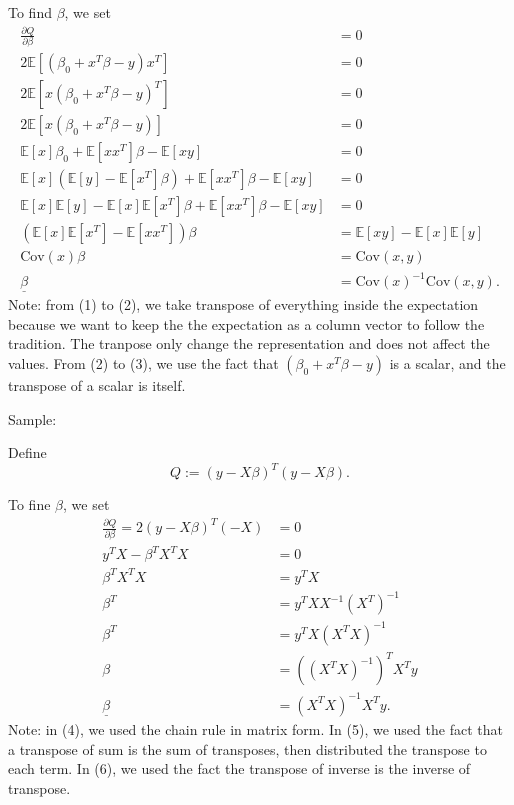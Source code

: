 \documentclass{article}
\begin{document}
To find $\beta$, we set
\begin{align}
    \frac{\partial Q}{\partial \beta} & = 0 \nonumber \\
    2\mathbb{E}\left[(\beta_0+x^T\beta-y)x^T\right] & = 0 \\
    2\mathbb{E}\left[x(\beta_0+x^T\beta-y)^T\right] & = 0 \\
    2\mathbb{E}\left[x(\beta_0+x^T\beta-y)\right] & = 0 \\
    \mathbb{E}\left[x\right]\beta_0 + \mathbb{E}\left[xx^T\right]\beta - \mathbb{E}[xy] & = 0 \nonumber \\
    \mathbb{E}[x]\left(\mathbb{E}[y]-\mathbb{E}\left[x^T\right]\beta\right) + 
    \mathbb{E}\left[xx^T\right]\beta - \mathbb{E}[xy] & = 0 \nonumber \\
    \mathbb{E}[x]\mathbb{E}[y] - \mathbb{E}[x]\mathbb{E}\left[x^T\right]\beta +
    \mathbb{E}\left[xx^T\right]\beta - \mathbb{E}[xy] & = 0 \nonumber \\
    \left(\mathbb{E}[x]\mathbb{E}\left[x^T\right] - \mathbb{E}\left[xx^T\right]\right)\beta & = 
    \mathbb{E}[xy] - \mathbb{E}[x]\mathbb{E}[y] \nonumber \\
    \mathrm{Cov}(x)\beta & = \mathrm{Cov}(x,y) \nonumber \\
    \underline{\beta} & = \mathrm{Cov}(x)^{-1}\mathrm{Cov}(x,y). \nonumber 
\end{align}
Note: from (1) to (2), we take transpose of everything inside the expectation because we want to 
keep the the expectation as a column vector to follow the tradition. The tranpose only change 
the representation and does not affect the values.
From (2) to (3), we use the fact that $(\beta_0+x^T\beta-y)$ is a scalar, and the transpose of a 
scalar is itself.

Sample:

Define $$Q:= (y-X\beta)^T(y-X\beta).$$

To fine $\beta$, we set
\begin{align}
    \frac{\partial Q}{\partial \beta} = 2(y-X\beta)^T(-X) & = 0 \\
    y^TX-\beta^TX^TX & = 0  \\
    \beta^TX^TX & = y^TX \nonumber \\
    \beta^T & = y^TXX^{-1}\left(X^{T}\right)^{-1} \nonumber \\
    \beta^T & = y^TX\left(X^TX\right)^{-1} \nonumber \\
    \beta & = \left(\left(X^TX\right)^{-1}\right)^TX^Ty \\
    \underline{\beta} & = \left(X^TX\right)^{-1}X^Ty. \nonumber
\end{align}
Note: in (4), we used the chain rule in matrix form. In (5), we used the fact that a transpose of 
sum is the sum of transposes, then distributed the transpose to each term. In (6), we used the fact 
the transpose of inverse is the inverse of transpose. 
\end{document}
